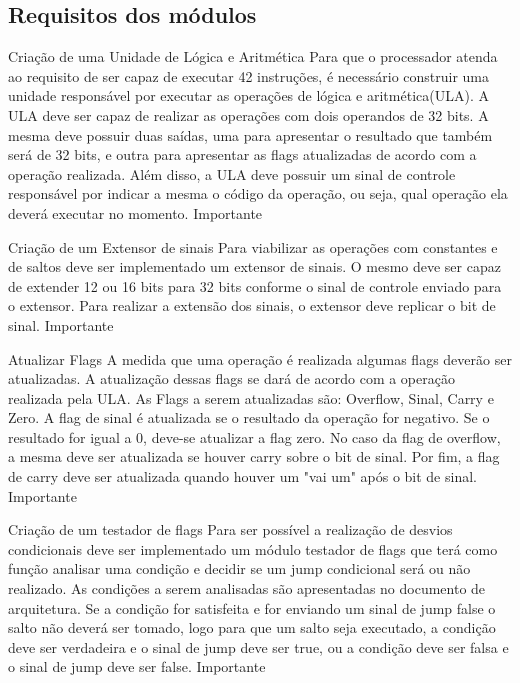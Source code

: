 \documentclass{report}
\begin{document}
    \subsection{Requisitos dos módulos}
    \begin{functional}
      \requirement
      {Criação de uma Unidade de Lógica e Aritmética}
      {Para que o processador atenda ao requisito de ser capaz de executar 42 instruções, é necessário construir uma unidade responsável por executar as operações de lógica e aritmética(ULA). A ULA deve ser capaz de realizar as operações com dois operandos de 32 bits. A mesma deve possuir duas saídas, uma para apresentar o resultado que também será de 32 bits, e outra para apresentar as flags atualizadas de acordo com a operação realizada. Além disso, a ULA deve possuir um sinal de controle responsável por indicar a mesma o código da operação, ou seja, qual operação ela deverá executar no momento.}
      {Importante}
      
       \requirement
      {Criação de um Extensor de sinais}
      {Para viabilizar as operações com constantes e de saltos deve ser implementado um extensor de sinais. O mesmo deve ser capaz de extender 12 ou 16 bits para 32 bits conforme o sinal de controle enviado para o extensor. Para realizar a extensão dos sinais, o extensor deve replicar o bit de sinal.}
      {Importante}
      
    \requirement
      {Atualizar Flags}
      {A medida que uma operação é realizada algumas flags deverão ser atualizadas. A atualização dessas flags se dará de acordo com a operação realizada pela ULA. As Flags a serem atualizadas são: Overflow, Sinal, Carry e Zero. A flag de sinal é atualizada se o resultado da operação for negativo. Se o resultado for igual a 0, deve-se atualizar a flag zero. No caso da flag de overflow, a mesma deve ser atualizada se houver carry sobre o bit de sinal. Por fim, a flag de carry deve ser atualizada quando houver um "vai um" após o bit de sinal.  }
      {Importante}
   
      \requirement
      {Criação de um testador de flags}
      {Para ser possível a realização de desvios condicionais deve ser implementado um módulo testador de flags que terá como função analisar uma condição e decidir se um jump condicional será ou não realizado. As condições a serem analisadas são apresentadas no documento de arquitetura. Se a condição for satisfeita e for enviando um sinal de jump false o salto não deverá ser tomado, logo para que um salto seja executado,  a condição deve ser verdadeira e o sinal de jump deve ser true, ou a condição deve ser falsa e o sinal de jump deve ser false. }
      {Importante}
      

\end{functional}
\end{document}
